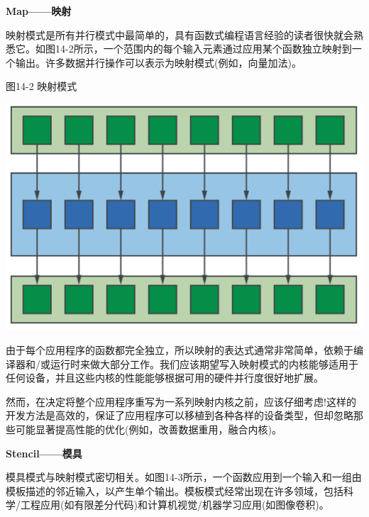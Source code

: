 \hspace*{\fill} \par %
\textbf{Map——映射}

映射模式是所有并行模式中最简单的，具有函数式编程语言经验的读者很快就会熟悉它。如图14-2所示，一个范围内的每个输入元素通过应用某个函数独立映射到一个输出。许多数据并行操作可以表示为映射模式(例如，向量加法)。\par

\hspace*{\fill} \par %
图14-2 映射模式
\begin{center}
	\includegraphics[width=1.\textwidth]{content/chapter-14/images/2}
\end{center}

由于每个应用程序的函数都完全独立，所以映射的表达式通常非常简单，依赖于编译器和/或运行时来做大部分工作。我们应该期望写入映射模式的内核能够适用于任何设备，并且这些内核的性能能够根据可用的硬件并行度很好地扩展。\par

然而，在决定将整个应用程序重写为一系列映射内核之前，应该仔细考虑!这样的开发方法是高效的，保证了应用程序可以移植到各种各样的设备类型，但却忽略那些可能显著提高性能的优化(例如，改善数据重用，融合内核)。\par

\hspace*{\fill} \par %
\textbf{Stencil——模具}

模具模式与映射模式密切相关。如图14-3所示，一个函数应用到一个输入和一组由模板描述的邻近输入，以产生单个输出。模板模式经常出现在许多领域，包括科学/工程应用(如有限差分代码)和计算机视觉/机器学习应用(如图像卷积)。\par

